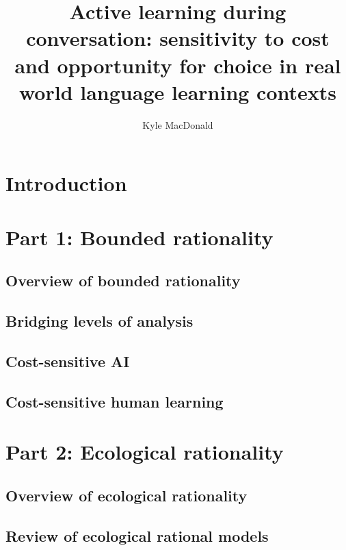 \documentclass[a4paper,man,apacite,floatsintext]{apa6}
\date{}
\title{\textbf{Active learning during conversation: sensitivity to cost and opportunity
for choice in real world language learning contexts}}
\author{Kyle MacDonald}
\affiliation{Department of Psychology, Stanford University}
\begin{document}
\maketitle

\section{Introduction}\label{introduction}

\section{Part 1: Bounded rationality}\label{part-1-bounded-rationality}

\subsection{Overview of bounded
rationality}\label{overview-of-bounded-rationality}

\subsection{Bridging levels of
analysis}\label{bridging-levels-of-analysis}

\subsection{Cost-sensitive AI}\label{cost-sensitive-ai}

\subsection{Cost-sensitive human
learning}\label{cost-sensitive-human-learning}

\section{Part 2: Ecological
rationality}\label{part-2-ecological-rationality}

\subsection{Overview of ecological
rationality}\label{overview-of-ecological-rationality}

\subsection{Review of ecological rational
models}\label{review-of-ecological-rational-models}
\end{document}
